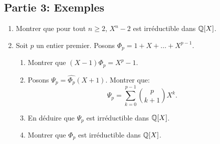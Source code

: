 \subsection*{Partie 3: Exemples}
\begin{enumerate}
\item  Montrer que pour tout $n\geq 2$, $X^{n}-2$ est irréductible dans $\mathbb{Q}[X]$. 
\item  Soit $p$ un entier premier. Posons $\Phi_{p} = 1 + X + ... + X^{p-1}$. 
\begin{enumerate}
  \item Montrer que $(X-1)\Phi_{p} = X^{p}-1$.
  \item Posons $\Psi_{p} = \widehat{\Phi_{p}}(X+1)$. Montrer que:
  $$\Psi_{p} = \sum_{k=0}^{p-1}\binom{p}{k+1}X^{k}.$$
  \item En déduire que $\Psi_{p}$ est irréductible dans $\mathbb{Q}[X]$. 
  \item Montrer que $\Phi_{p}$ est irréductible dans $\mathbb{Q}[X]$. 
\end{enumerate}
\end{enumerate}






